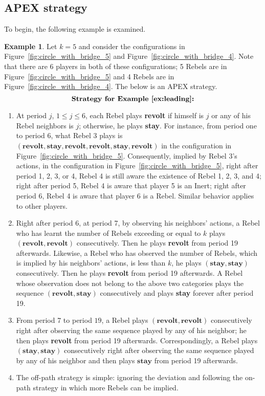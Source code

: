 \documentclass[12pt,letter]{article}
\theoremstyle{definition}
\newtheorem{example}{Example}
\theoremstyle{definition}
\theoremstyle{remark}
\theoremstyle{claim}
\begin{document}
\subsection{APEX strategy}
\label{sec:apex_strategy}
To begin, the following example is examined.
\begin{example}
\label{ex:leading}
Let $k=5$ and consider the configurations in Figure~\ref{fig:circle_with_bridge_5} and Figure~\ref{fig:circle_with_bridge_4}. Note that there are 6 players in both of these configurations; 5 Rebels are in Figure~\ref{fig:circle_with_bridge_5} and 4 Rebels are in Figure~\ref{fig:circle_with_bridge_4}. The below is an APEX strategy.
\[\textbf{Strategy for Example~\ref{ex:leading}:}\]
\begin{enumerate}
\item At period $j$, $1\leq j \leq 6$, each Rebel plays \textbf{revolt} if himself is $j$ or any of his Rebel neighbors is $j$; otherwise, he plays \textbf{stay}. 
For instance, from period one to period 6, what Rebel 3 plays is $(\textbf{revolt},\textbf{stay},\textbf{revolt}, \textbf{revolt},\textbf{stay}, \textbf{revolt})$ in the configuration in Figure~\ref{fig:circle_with_bridge_5}. Consequently, implied by Rebel 3's actions, in the configuration in Figure~\ref{fig:circle_with_bridge_5}, right after period 1, 2, 3, or 4, Rebel 4 is still aware the existence of Rebel 1, 2, 3, and 4; right after period 5, Rebel 4 is aware that player 5 is an Inert; right after period 6, Rebel 4 is aware that player 6 is a Rebel. Similar behavior applies to other players. 
\item Right after period 6, at period 7, by observing his neighbors' actions, a Rebel who has learnt the number of Rebels exceeding or equal to $k$ plays $(\textbf{revolt},\textbf{revolt})$ consecutively. Then he plays \textbf{revolt} from period 19 afterwards. Likewise, a Rebel who has observed the number of Rebels, which is implied by his neighbors' actions, is less than $k$, he plays $(\textbf{stay},\textbf{stay})$ consecutively. Then he plays \textbf{revolt} from period 19 afterwards. A Rebel whose observation does not belong to the above two categories plays the sequence $(\textbf{revolt},\textbf{stay})$ consecutively and plays \textbf{stay} forever after period 19. 
\item From period 7 to period $19$, a Rebel plays $(\textbf{revolt},\textbf{revolt})$ consecutively right after observing the same sequence played by any of his neighbor; he then plays \textbf{revolt} from period 19 afterwards. Correspondingly, a Rebel plays $(\textbf{stay},\textbf{stay})$ consecutively right after observing the same sequence played by any of his neighbor and then plays $\textbf{stay}$ from period 19 afterwards. 
\item The off-path strategy is simple: ignoring the deviation and following the on-path strategy in which more Rebels can be implied. 
\end{enumerate}


\end{example}
\end{document}
